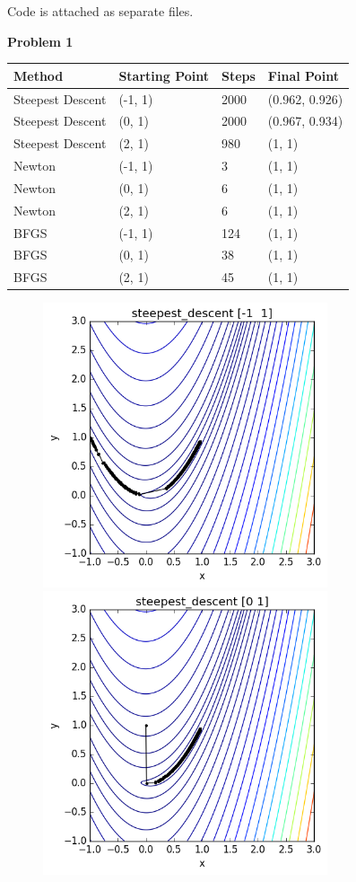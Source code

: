 \documentclass[11pt]{article}
\newcommand{\problem}{\medskip \noindent \textbf}
\begin{document}
 \medskip
Code is attached as separate files.

\problem{Problem 1}

\begin{tabular}{l | l | l | l}
Method & Starting Point & Steps & Final Point\\
\hline
Steepest Descent & (-1, 1) & 2000 & (0.962, 0.926)\\
Steepest Descent & (0, 1) & 2000 & (0.967, 0.934)\\
Steepest Descent & (2, 1) & 980 & (1, 1)\\
Newton & (-1, 1) & 3 & (1, 1)\\
Newton & (0, 1) & 6 & (1, 1)\\
Newton & (2, 1) & 6 & (1, 1)\\
BFGS & (-1, 1) & 124 & (1, 1)\\
BFGS & (0, 1) & 38 & (1, 1)\\
BFGS & (2, 1) & 45 & (1, 1)
\end{tabular}

\begin{figure}[h!]
  \includegraphics[width=3.3in]{rosenbrock-steepest-descent-1.png}
  \includegraphics[width=3.3in]{rosenbrock-steepest-descent0.png}
\end{figure}
\end{document}
